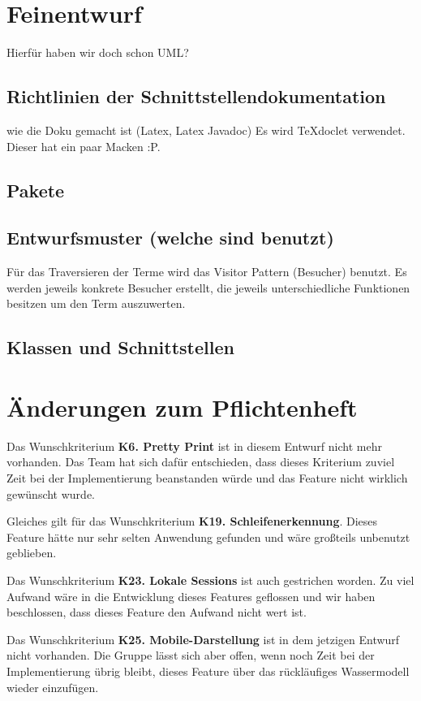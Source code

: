 \documentclass[parskip=full,11pt,twoside]{scrartcl}
\begin{document}
\section{Feinentwurf}
Hierfür haben wir doch schon UML?
\subsection{Richtlinien der Schnittstellendokumentation}

wie die Doku gemacht ist (Latex, Latex Javadoc)
Es wird TeXdoclet verwendet. Dieser hat ein paar Macken :P.
\subsection{Pakete}
\subsection{Entwurfsmuster (welche sind benutzt)}
Für das Traversieren der Terme wird das Visitor Pattern (Besucher) benutzt. Es werden jeweils konkrete Besucher erstellt, die jeweils unterschiedliche Funktionen besitzen um den Term auszuwerten.
\subsection{Klassen und Schnittstellen}
\pagebreak

\section{Änderungen zum Pflichtenheft}
Das Wunschkriterium \textbf{K6. Pretty Print} ist in diesem Entwurf nicht mehr vorhanden. Das Team hat sich dafür entschieden, dass dieses Kriterium zuviel Zeit bei der Implementierung beanstanden würde und das Feature nicht wirklich gewünscht wurde.

Gleiches gilt für das Wunschkriterium \textbf{K19. Schleifenerkennung}. Dieses Feature hätte nur sehr selten Anwendung gefunden und wäre großteils unbenutzt geblieben.

Das Wunschkriterium \textbf{K23. Lokale Sessions} ist auch gestrichen worden. Zu viel Aufwand wäre in die Entwicklung dieses Features geflossen und wir haben beschlossen, dass dieses Feature den Aufwand nicht wert ist. 

Das Wunschkriterium \textbf{K25. Mobile-Darstellung} ist in dem jetzigen Entwurf nicht vorhanden. Die Gruppe lässt sich aber offen, wenn noch Zeit bei der Implementierung übrig bleibt, dieses Feature über das rückläufiges Wassermodell wieder einzufügen.
\end{document}
